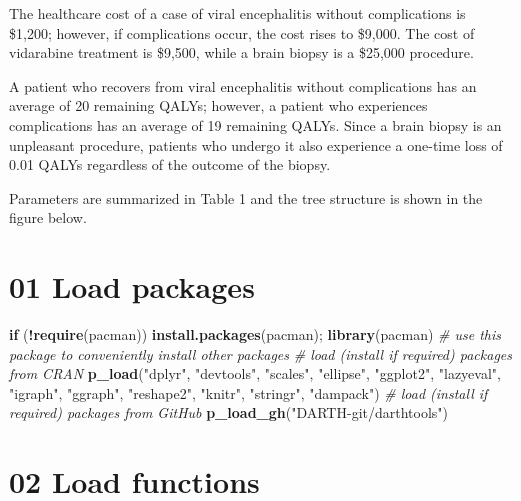 \documentclass[
]{article}
\newenvironment{Shaded}{\begin{snugshade}}{\end{snugshade}}
\newcommand{\CommentTok}[1]{\textcolor[rgb]{0.56,0.35,0.01}{\textit{#1}}}
\newcommand{\ControlFlowTok}[1]{\textcolor[rgb]{0.13,0.29,0.53}{\textbf{#1}}}
\newcommand{\FunctionTok}[1]{\textcolor[rgb]{0.13,0.29,0.53}{\textbf{#1}}}
\newcommand{\NormalTok}[1]{#1}
\newcommand{\SpecialCharTok}[1]{\textcolor[rgb]{0.81,0.36,0.00}{\textbf{#1}}}
\newcommand{\StringTok}[1]{\textcolor[rgb]{0.31,0.60,0.02}{#1}}
\begin{document}
The healthcare cost of a case of viral encephalitis without
complications is \$1,200; however, if complications occur, the cost
rises to \$9,000. The cost of vidarabine treatment is \$9,500, while a
brain biopsy is a \$25,000 procedure.

A patient who recovers from viral encephalitis without complications has
an average of 20 remaining QALYs; however, a patient who experiences
complications has an average of 19 remaining QALYs. Since a brain biopsy
is an unpleasant procedure, patients who undergo it also experience a
one-time loss of 0.01 QALYs regardless of the outcome of the biopsy.

Parameters are summarized in Table 1 and the tree structure is shown in
the figure below.

\hypertarget{load-packages}{%
\section{01 Load packages}\label{load-packages}}

\begin{Shaded}
\begin{Highlighting}[]
\ControlFlowTok{if}\NormalTok{ (}\SpecialCharTok{!}\FunctionTok{require}\NormalTok{(}\StringTok{\textquotesingle{}pacman\textquotesingle{}}\NormalTok{)) }\FunctionTok{install.packages}\NormalTok{(}\StringTok{\textquotesingle{}pacman\textquotesingle{}}\NormalTok{); }\FunctionTok{library}\NormalTok{(pacman) }\CommentTok{\# use this package to conveniently install other packages}
\CommentTok{\# load (install if required) packages from CRAN}
\FunctionTok{p\_load}\NormalTok{(}\StringTok{"dplyr"}\NormalTok{, }\StringTok{"devtools"}\NormalTok{, }\StringTok{"scales"}\NormalTok{, }\StringTok{"ellipse"}\NormalTok{, }\StringTok{"ggplot2"}\NormalTok{, }\StringTok{"lazyeval"}\NormalTok{, }\StringTok{"igraph"}\NormalTok{,  }\StringTok{"ggraph"}\NormalTok{, }\StringTok{"reshape2"}\NormalTok{, }\StringTok{"knitr"}\NormalTok{, }\StringTok{"stringr"}\NormalTok{, }\StringTok{"dampack"}\NormalTok{)}
\CommentTok{\# load (install if required) packages from GitHub}
\FunctionTok{p\_load\_gh}\NormalTok{(}\StringTok{"DARTH{-}git/darthtools"}\NormalTok{)}
\end{Highlighting}
\end{Shaded}

\hypertarget{load-functions}{%
\section{02 Load functions}\label{load-functions}}
\end{document}
